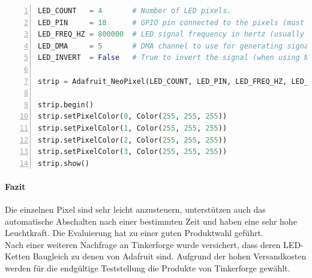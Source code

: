 \begin{itemize}
\begin{lstlisting}[caption = Testcode zur Ansteuerung der LEDs, language=python, frame=single, breaklines=true,columns=fullflexible, commentstyle=\color{gray}\upshape, captionpos=b, numbers = left]
LED_COUNT   = 4       # Number of LED pixels. 
LED_PIN     = 18      # GPIO pin connected to the pixels (must support PWM!).
LED_FREQ_HZ = 800000  # LED signal frequency in hertz (usually 800khz)
LED_DMA     = 5       # DMA channel to use for generating signal (try 5)
LED_INVERT  = False   # True to invert the signal (when using NPN)

strip = Adafruit_NeoPixel(LED_COUNT, LED_PIN, LED_FREQ_HZ, LED_DMA, LED_INVERT)

strip.begin()
strip.setPixelColor(0, Color(255, 255, 255))
strip.setPixelColor(1, Color(255, 255, 255))
strip.setPixelColor(2, Color(255, 255, 255))
strip.setPixelColor(3, Color(255, 255, 255))
strip.show()
\end{lstlisting}
\end{itemize}
\paragraph{Fazit}
Die einzelnen Pixel sind sehr leicht anzusteuern, unterstützen auch das automatische Abschalten nach einer bestimmten Zeit und haben eine sehr hohe Leuchtkraft. Die Evaluierung hat zu einer guten Produktwahl geführt. \\ 
Nach einer weiteren Nachfrage an Tinkerforge wurde versichert, dass deren LED-Ketten Baugleich zu denen von Adafruit sind. Aufgrund der hohen Versandkosten werden für die endgültige Teststellung die Produkte von Tinkerforge gewählt.
